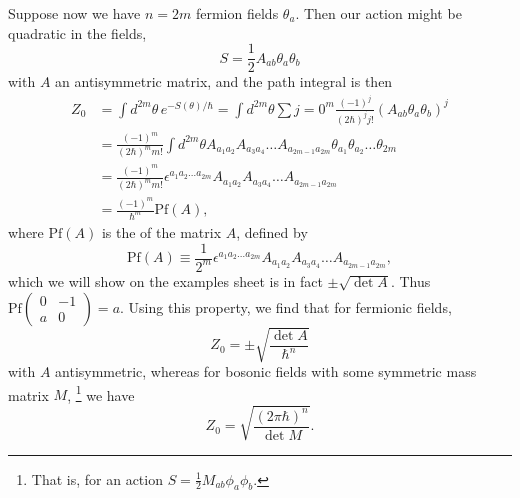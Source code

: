 Suppose now we have $n=2m$ fermion fields $\theta_a$. Then our action might be quadratic in the fields,
\begin{equation}
    S=\frac{1}{2} A_{ab} \theta_a \theta_b
\end{equation}
with $A$ an antisymmetric matrix, and the path integral is then
\begin{align*}
    Z_0 &= \int d^{2m}\theta\, e^{-S(\theta)/\hbar} = \int d^{2m} \theta \sum{j=0}^{m} \frac{(-1)^j}{(2\hbar)^j j!} (A_{ab}\theta_a \theta_b)^j\\
    &= \frac{(-1)^m}{(2\hbar)^m m!} \int d^{2m}\theta A_{a_1 a_2} A_{a_3 a_4} \ldots A_{a_{2m-1} a_{2m}} \theta_{a_1} \theta_{a_2} \ldots \theta_{2m}\\
    &= \frac{(-1)^m}{(2\hbar)^m m!} \epsilon^{a_1 a_2 \ldots a_{2m}} A_{a_1 a_2} A_{a_3 a_4} \ldots A_{a_{2m-1} a_{2m}}\\
    &= \frac{(-1)^m}{\hbar^m} \text{Pf}(A),
\end{align*}
where $\text{Pf}(A)$ is the  of the matrix $A$, defined by
\begin{equation}
    \text{Pf}(A)\equiv \frac{1}{2^m} \epsilon^{a_1 a_2 \ldots a_{2m}} A_{a_1 a_2} A_{a_3 a_4} \ldots A_{a_{2m-1} a_{2m}},
\end{equation}
which we will show on the examples sheet is in fact $\pm \sqrt{\det A}.$ Thus $\text{Pf}\begin{pmatrix}0 & -1 \\ a & 0 \end{pmatrix} = a$. Using this property, we find that for fermionic fields,
\begin{equation}
    Z_0 = \pm \sqrt{\frac{\det A}{\hbar^n}}
\end{equation}
with $A$ antisymmetric, whereas for bosonic fields with some symmetric mass matrix $M$,%
    \footnote{That is, for an action $S=\frac{1}{2}M_{ab}\phi_a \phi_b$.}
we have
\begin{equation}
    Z_0=\sqrt{\frac{(2\pi \hbar)^n}{\det M}}.
\end{equation}

